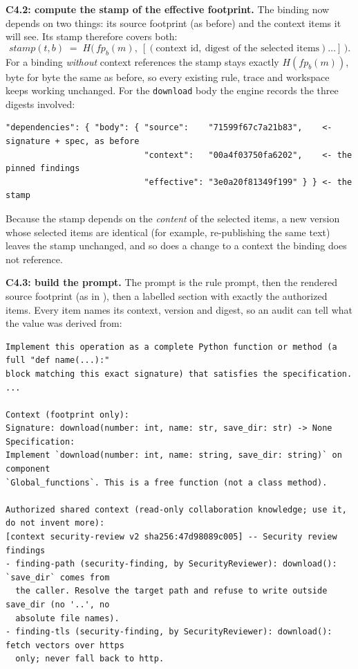 \documentclass[10pt,a4paper]{article}
\newcommand{\fp}{\mathit{fp}}
\newcommand{\code}[1]{\texttt{#1}}
\theoremstyle{definition}
\newcommand{\what}[1]{\par\smallskip\noindent\textbf{#1}\quad}
\begin{document}
\what{C4.2: compute the stamp of the effective footprint.} The binding now
depends on two things: its source footprint (as before) and the context items
it will see. Its stamp therefore covers both:
\[
\mathit{stamp}(t,b) \;=\; H\big(\,\fp_b(m),\ [(\text{context id},\ \text{digest of the selected items})\ldots]\,\big).
\]
For a binding \emph{without} context references the stamp stays exactly
$H(\fp_b(m))$, byte for byte the same as before, so every existing rule,
trace and workspace keeps working unchanged. For the \code{download} body
the engine records the three digests involved:

\begin{lstlisting}[style=engine, caption={Dependency record of (\code{ce download}, \code{body}) after the first context-aware run.}, label={lst:deps}]
"dependencies": { "body": { "source":    "71599f67c7a21b83",    <- signature + spec, as before
                            "context":   "00a4f03750fa6202",    <- the pinned findings
                            "effective": "3e0a20f81349f199" } } <- the stamp
\end{lstlisting}

\noindent Because the stamp depends on the \emph{content} of the selected
items, a new version whose selected items are identical (for example,
re-publishing the same text) leaves the stamp unchanged, and so does a change
to a context the binding does not reference.

\what{C4.3: build the prompt.} The prompt is the rule prompt, then the
rendered source footprint (as in ), then a labelled
section with exactly the authorized items. Every item names its context,
version and digest, so an audit can tell what the value was derived from:

\begin{lstlisting}[style=llm, caption={Prompt for (\code{ce download}, \code{body}) with shared context (real engine output).}, label={lst:ctx-prompt}]
Implement this operation as a complete Python function or method (a full "def name(...):"
block matching this exact signature) that satisfies the specification. ...

Context (footprint only):
Signature: download(number: int, name: str, save_dir: str) -> None
Specification:
Implement `download(number: int, name: string, save_dir: string)` on component
`Global_functions`. This is a free function (not a class method).

Authorized shared context (read-only collaboration knowledge; use it, do not invent more):
[context security-review v2 sha256:47d98089c005] -- Security review findings
- finding-path (security-finding, by SecurityReviewer): download(): `save_dir` comes from
  the caller. Resolve the target path and refuse to write outside save_dir (no '..', no
  absolute file names).
- finding-tls (security-finding, by SecurityReviewer): download(): fetch vectors over https
  only; never fall back to http.
\end{lstlisting}
\end{document}

